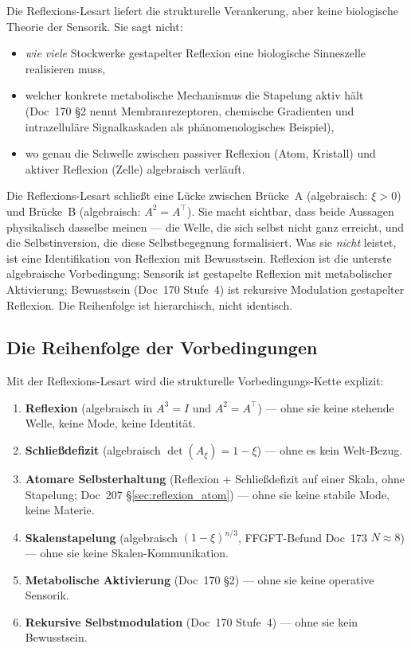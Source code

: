 Die Reflexions-Lesart liefert die strukturelle Verankerung, aber keine biologische Theorie der Sensorik. Sie sagt nicht:

\begin{itemize}
\item \emph{wie viele} Stockwerke gestapelter Reflexion eine biologische Sinneszelle realisieren muss,
\item welcher konkrete metabolische Mechanismus die Stapelung aktiv hält (Doc~170 \S2 nennt Membranrezeptoren, chemische Gradienten und intrazelluläre Signalkaskaden als phänomenologisches Beispiel),
\item wo genau die Schwelle zwischen \glqq passiver Reflexion\grqq{} (Atom, Kristall) und \glqq aktiver Reflexion\grqq{} (Zelle) algebraisch verläuft.
\end{itemize}

\begin{interpretation}
Die Reflexions-Lesart schließt eine Lücke zwischen Brücke~A (algebraisch: $\xi > 0$) und Brücke~B (algebraisch: $A^2 = A^\top$). Sie macht sichtbar, dass beide Aussagen physikalisch dasselbe meinen --- die Welle, die sich selbst nicht ganz erreicht, und die Selbstinversion, die diese Selbstbegegnung formalisiert. Was sie \emph{nicht} leistet, ist eine Identifikation von Reflexion mit Bewusstsein. Reflexion ist die unterste algebraische Vorbedingung; Sensorik ist gestapelte Reflexion mit metabolischer Aktivierung; Bewusstsein (Doc~170 Stufe~4) ist rekursive Modulation gestapelter Reflexion. Die Reihenfolge ist hierarchisch, nicht identisch.
\end{interpretation}

\subsection{Die Reihenfolge der Vorbedingungen}\label{sec:reflexion_reihenfolge}

Mit der Reflexions-Lesart wird die strukturelle Vorbedingungs-Kette explizit:

\begin{enumerate}
\item \textbf{Reflexion} (algebraisch in $A^3 = I$ und $A^2 = A^\top$) --- ohne sie keine stehende Welle, keine Mode, keine Identität.
\item \textbf{Schließdefizit} (algebraisch $\det(A_\xi) = 1-\xi$) --- ohne es kein Welt-Bezug.
\item \textbf{Atomare Selbsterhaltung} (Reflexion + Schließdefizit auf einer Skala, ohne Stapelung; Doc~207 \S\ref{sec:reflexion_atom}) --- ohne sie keine stabile Mode, keine Materie.
\item \textbf{Skalenstapelung} (algebraisch $(1-\xi)^{n/3}$, FFGFT-Befund Doc~173 $N \approx 8$) --- ohne sie keine Skalen-Kommunikation.
\item \textbf{Metabolische Aktivierung} (Doc~170 \S2) --- ohne sie keine operative Sensorik.
\item \textbf{Rekursive Selbstmodulation} (Doc~170 Stufe~4) --- ohne sie kein Bewusstsein.
\end{enumerate}

